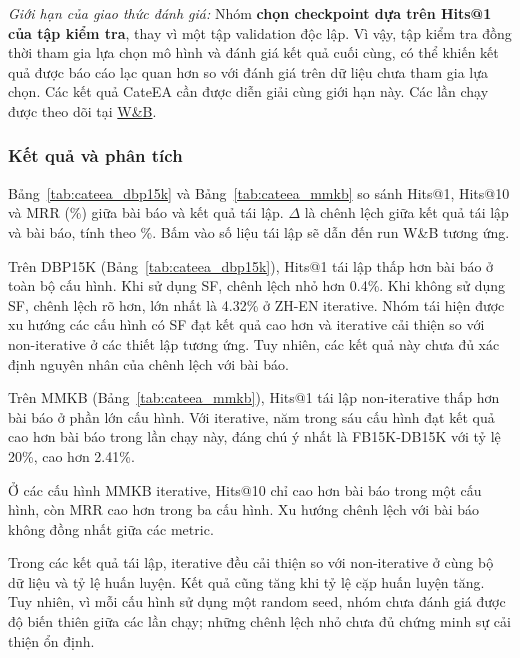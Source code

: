 \noindent\textit{Giới hạn của giao thức đánh giá:} Nhóm \textbf{chọn checkpoint dựa trên Hits@1 của tập kiểm tra}, thay vì một tập validation độc lập. Vì vậy, tập kiểm tra đồng thời tham gia lựa chọn mô hình và đánh giá kết quả cuối cùng, có thể khiến kết quả được báo cáo lạc quan hơn so với đánh giá trên dữ liệu chưa tham gia lựa chọn. Các kết quả CateEA cần được diễn giải cùng giới hạn này.
Các lần chạy được theo dõi tại \href{https://forge.coreweave.com/wandb/keiranoluv-hcmus/cateea-reproduction}{W\&B}.


\subsubsection{Kết quả và phân tích}

Bảng~\ref{tab:cateea_dbp15k} và Bảng~\ref{tab:cateea_mmkb}
so sánh Hits@1, Hits@10 và MRR (\%) giữa bài báo và kết quả tái lập.
$\Delta$ là chênh lệch giữa kết quả tái lập và bài báo,
tính theo \%. Bấm vào số liệu tái lập sẽ dẫn
đến run W\&B tương ứng.





Trên DBP15K (Bảng~\ref{tab:cateea_dbp15k}), Hits@1 tái lập
thấp hơn bài báo ở toàn bộ cấu hình. Khi sử dụng SF,
chênh lệch nhỏ hơn 0.4\%. Khi không sử dụng SF,
chênh lệch rõ hơn, lớn nhất là 4.32\% ở
ZH-EN iterative. Nhóm tái hiện được xu hướng các cấu hình
có SF đạt kết quả cao hơn và iterative cải thiện so với
non-iterative ở các thiết lập tương ứng. Tuy nhiên, các
kết quả này chưa đủ xác định nguyên nhân của chênh lệch
với bài báo.





Trên MMKB (Bảng~\ref{tab:cateea_mmkb}), Hits@1 tái lập
non-iterative thấp hơn bài báo ở phần lớn cấu hình.
Với iterative, năm trong sáu cấu hình đạt kết quả cao hơn
bài báo trong lần chạy này, đáng chú ý nhất là
FB15K-DB15K với tỷ lệ 20\%, cao hơn 2.41\%.

Ở các cấu hình MMKB iterative, Hits@10 chỉ cao hơn bài báo
trong một cấu hình, còn MRR cao hơn trong ba cấu hình.
Xu hướng chênh lệch với bài báo không đồng nhất giữa các metric.

Trong các kết quả tái lập, iterative đều cải thiện so với
non-iterative ở cùng bộ dữ liệu và tỷ lệ huấn luyện.
Kết quả cũng tăng khi tỷ lệ cặp huấn luyện tăng.
Tuy nhiên, vì mỗi cấu hình sử dụng một random seed,
nhóm chưa đánh giá được độ biến thiên giữa các lần chạy;
những chênh lệch nhỏ chưa đủ chứng minh sự cải thiện ổn định.

